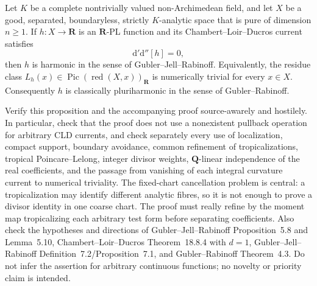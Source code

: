 \begin{proposition}
Let $K$ be a complete nontrivially valued non-Archimedean field, and let
$X$ be a good, separated, boundaryless, strictly $K$-analytic space that is
pure of dimension $n\geq1$.  If $h:X\to\mathbf R$ is an $\mathbf R$-PL function and
its Chambert--Loir--Ducros current satisfies
\[
                         \mathrm d'\mathrm d''[h]=0,
\]
then $h$ is harmonic in the sense of Gubler--Jell--Rabinoff.  Equivalently,
the residue class $L_h(x)\in\operatorname{Pic}(\operatorname{red}(X,x))_
{\mathbf R}$ is numerically trivial for every $x\in X$.  Consequently $h$
is classically pluriharmonic in the sense of Gubler--Rabinoff.
\end{proposition}

Verify this proposition and the accompanying proof source-awarely and
hostilely.  In particular, check that the proof does not use a nonexistent
pullback operation for arbitrary CLD currents, and check separately every
use of localization, compact support, boundary avoidance, common refinement
of tropicalizations, tropical Poincare--Lelong, integer divisor weights,
$\mathbf Q$-linear independence of the real coefficients, and the passage
from vanishing of each integral curvature current to numerical triviality.
The fixed-chart cancellation problem is central: a tropicalization may
identify different analytic fibres, so it is not enough to prove a divisor
identity in one coarse chart.  The proof must really refine by the moment
map tropicalizing each arbitrary test form before separating coefficients.
Also check the hypotheses and directions of Gubler--Jell--Rabinoff
Proposition~5.8 and Lemma~5.10, Chambert--Loir--Ducros
Theorem~18.8.4 with $d=1$, Gubler--Jell--Rabinoff
Definition~7.2/Proposition~7.1, and Gubler--Rabinoff Theorem~4.3.  Do not
infer the assertion for arbitrary continuous functions; no novelty or
priority claim is intended.
